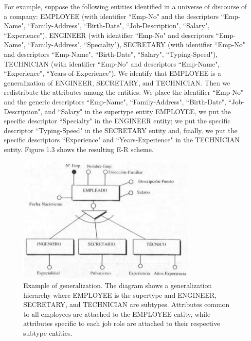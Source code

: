 \documentclass{article}
\begin{document}
For example, suppose the following entities identified in a universe of discourse of a company: EMPLOYEE (with identifier ``Emp-No" and the descriptors ``Emp-Name", ``Family-Address", ``Birth-Date", ``Job-Description", ``Salary", ``Experience"), ENGINEER (with identifier ``Emp-No" and descriptors ``Emp-Name", ``Family-Address", ``Specialty"), SECRETARY (with identifier ``Emp-No" and descriptors ``Emp-Name", ``Birth-Date", ``Salary", ``Typing-Speed"), TECHNICIAN (with identifier ``Emp-No" and descriptors ``Emp-Name", ``Experience", ``Years-of-Experience").  We identify that EMPLOYEE is a generalization of ENGINEER, SECRETARY, and TECHNICIAN.  Then we redistribute the attributes among the entities.  We place the identifier ``Emp-No" and the generic descriptors ``Emp-Name", ``Family-Address", ``Birth-Date", ``Job-Description", and ``Salary" in the supertype entity EMPLOYEE, we put the specific descriptor ``Specialty" in the ENGINEER entity; we put the specific descriptor ``Typing-Speed" in the SECRETARY entity and, finally, we put the specific descriptors ``Experience" and ``Years-Experience" in the TECHNICIAN entity.  Figure 1.3 shows the resulting E-R scheme.

\begin{figure}
    \centering
    \includegraphics[width=0.8\textwidth]{figures/fig3}
    \caption{Example of generalization. The diagram shows a generalization hierarchy where EMPLOYEE is the supertype and ENGINEER, SECRETARY, and TECHNICIAN are subtypes. Attributes common to all employees are attached to the EMPLOYEE entity, while attributes specific to each job role are attached to their respective subtype entities.}
    \label{fig:fig1.3}
\end{figure}
\end{document}
